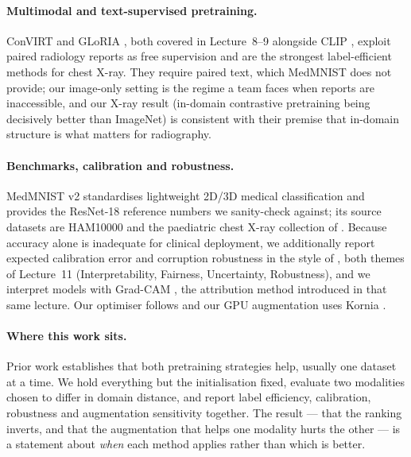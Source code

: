 \documentclass{article}
\begin{document}
\paragraph{Multimodal and text-supervised pretraining.} ConVIRT
\citep{zhang2022convirt} and GLoRIA \citep{huang2021gloria}, both covered in Lecture~8--9
alongside CLIP \citep{radford2021clip}, exploit paired radiology reports as free
supervision and are the strongest label-efficient methods for chest X-ray. They require
paired text, which MedMNIST does not provide; our image-only setting is the regime a team
faces when reports are inaccessible, and our X-ray result (in-domain contrastive
pretraining being decisively better than ImageNet) is consistent with their premise that
in-domain structure is what matters for radiography.

\paragraph{Benchmarks, calibration and robustness.} MedMNIST v2
\citep{yang2023medmnist} standardises lightweight 2D/3D medical classification and
provides the ResNet-18 reference numbers we sanity-check against; its source datasets are
HAM10000 \citep{tschandl2018ham10000} and the paediatric chest X-ray collection of
\citet{kermany2018identifying}. Because accuracy alone is inadequate for clinical
deployment, we additionally report expected calibration error \citep{guo2017calibration}
and corruption robustness in the style of \citet{hendrycks2019robustness}, both themes of
Lecture~11 (Interpretability, Fairness, Uncertainty, Robustness), and we interpret models
with Grad-CAM \citep{selvaraju2017gradcam}, the attribution method introduced in that
same lecture. Our optimiser follows \citet{loshchilov2019adamw} and our GPU augmentation
uses Kornia \citep{riquelme2025kornia}.

\paragraph{Where this work sits.} Prior work establishes that both pretraining strategies
help, usually one dataset at a time. We hold everything but the initialisation fixed,
evaluate two modalities chosen to differ in domain distance, and report label efficiency,
calibration, robustness and augmentation sensitivity together. The result --- that the
ranking inverts, and that the augmentation that helps one modality hurts the other --- is
a statement about \emph{when} each method applies rather than which is better.
\end{document}
